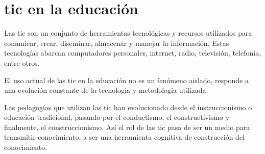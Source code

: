\section{\Gls{tic} en la educación}

Las \Gls{tic} son un conjunto de herramientas tecnológicas y recursos utilizados
para comunicar, crear, diseminar, almacenar y manejar la
información\cite{unesco:ict}. Estas tecnologías abarcan computadores personales,
internet, radio, televisión, telefonía, entre otros\cite{tinio:ict}.

El uso actual de las \Gls{tic} en la educación no es un fenómeno aislado,
responde a una evolución constante de la tecnología y metodología
utilizada\cite{egenfeldt2007third}.

Las pedagogías que utilizan las \gls{tic} han evolucionado desde el
instruccionismo o educación tradicional, pasando por el conductismo, el
constructivismo y finalmente, el
construccionismo\cite{egenfeldt2007third,white:ict}. Así el rol de las \gls{tic}
pasa de ser un medio para transmitir conocimiento, a ser una herramienta
cognitiva de construcción del
conocimiento\cite{ict:ttc,valdivia:sg,sasha:construtivism}.

